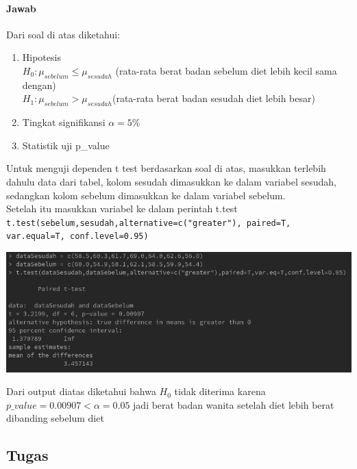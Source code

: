 \documentclass[a4paper,12pt]{article}
\begin{document}
\paragraph{Jawab\\}
Dari soal di atas diketahui:
\begin{enumerate}[label = \alph*.]
    \item Hipotesis \\
        $H_{0} : \mu_{sebelum} \leq \mu_{sesudah}$ (rata-rata berat badan sebelum diet lebih kecil sama dengan)\\
        $H_{1} : \mu_{sebelum} > \mu_{sesudah}$(rata-rata berat badan sesudah diet lebih besar)
    \item Tingkat signifikansi $\alpha = 5\%$
    \item Statistik uji p\_value
\end{enumerate}
Untuk menguji dependen t test berdasarkan soal di atas, masukkan terlebih dahulu data dari tabel, kolom sesudah dimasukkan ke dalam variabel sesudah, sedangkan kolom sebelum dimasukkan ke 
dalam variabel sebelum.\\
Setelah itu masukkan variabel ke dalam perintah t.test\\
\texttt{t.test(sebelum,sesudah,alternative=c("greater"), paired=T, var.equal=T, conf.level=0.95)}
\begin{center}
    \includegraphics[width = \linewidth]{lat2.png}
\end{center}
Dari output diatas diketahui bahwa $H_{0}$ tidak diterima karena $p\_value = 0.00907 < \alpha = 0.05$ jadi berat badan wanita setelah diet lebih berat dibanding sebelum diet

\newpage

\subsection{Tugas}
\end{document}
